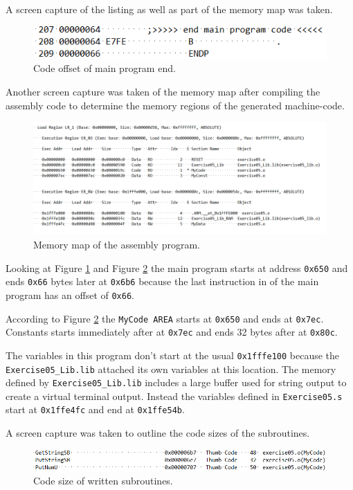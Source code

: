 \documentclass[\FontSize\FontUnit,letterpaper,oneside]{article}
\def\code#1{\texttt{#1}}
\begin{document}
\pagebreak

A screen capture of the listing as well as part of the memory map was taken.

\begin{figure}[h!]
	\centering
	\includegraphics[]{end_offset}
	\caption{Code offset of main program end.}
	\label{fig:prog}
\end{figure}

Another screen capture was taken of the memory map after compiling the
assembly code to determine the memory regions of the generated machine-code.

\begin{figure}[h!]
	\centering
	\includegraphics[width=\textwidth]{mem_map.png}
	\caption{Memory map of the assembly program.}
	\label{fig:memmap}
\end{figure}


Looking at Figure \ref{fig:prog} and Figure \ref{fig:memmap} the main program starts at address \code{0x650} and ends \code{0x66} bytes later at \code{0x6b6} because the last instruction in of the main program has an offset of \code{0x66}.


According to Figure \ref{fig:memmap} the \code{MyCode AREA} starts at \code{0x650} and ends at \code{0x7ec}. Constants starts immediately after at \code{0x7ec} and ends 32 bytes after at \code{0x80c}. 

The variables in this program don't start at the usual \code{0x1fffe100} because the \code{Exercise05\_Lib.lib} attached its own variables at this location. The memory defined by \code{Exercise05\_Lib.lib} includes a large buffer used for string output to create a virtual terminal output. Instead the variables defined in \code{Exercise05.s} start at \code{0x1ffe4fc} and end at \code{0x1ffe54b}.

A screen capture was taken to outline the code sizes of the subroutines.
\begin{figure}[h!]
	\centering
	\includegraphics[width=\textwidth]{code_size.png}
	\caption{Code size of written subroutines.}
	\label{fig:sizes}
\end{figure}
\end{document}
